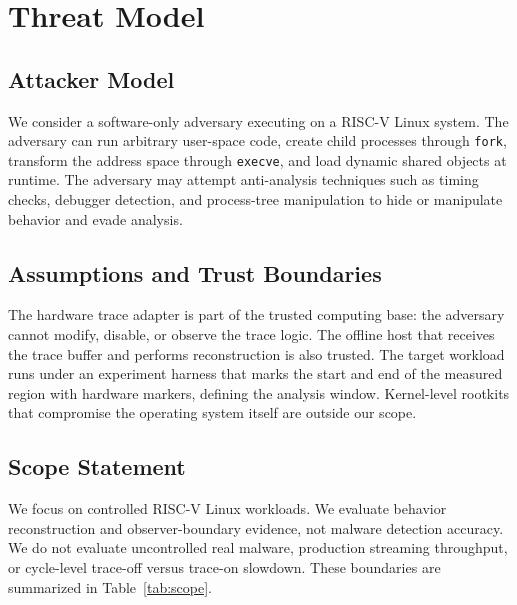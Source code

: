 \section{Threat Model}
\label{sec:threat-model}

\subsection{Attacker Model}
\label{sec:threat-model:attacker}

We consider a software-only adversary executing on a RISC-V Linux system.
The adversary can run arbitrary user-space code, create child processes
through \texttt{fork}, transform the address space through \texttt{execve},
and load dynamic shared objects at runtime.
The adversary may attempt anti-analysis techniques such as timing checks,
debugger detection, and process-tree manipulation to hide or manipulate
behavior and evade analysis.

\subsection{Assumptions and Trust Boundaries}
\label{sec:threat-model:assumptions}

The hardware trace adapter is part of the trusted computing base: the
adversary cannot modify, disable, or observe the trace logic.
The offline host that receives the trace buffer and performs reconstruction
is also trusted.
The target workload runs under an experiment harness that marks the start
and end of the measured region with hardware markers, defining the analysis
window.
Kernel-level rootkits that compromise the operating system itself are
outside our scope.

\subsection{Scope Statement}
\label{sec:threat-model:scope}

We focus on controlled RISC-V Linux workloads.
We evaluate behavior reconstruction and observer-boundary evidence, not malware
detection accuracy. We do not evaluate uncontrolled real malware, production
streaming throughput, or cycle-level trace-off versus trace-on slowdown. These
boundaries are summarized in Table~\ref{tab:scope}.


